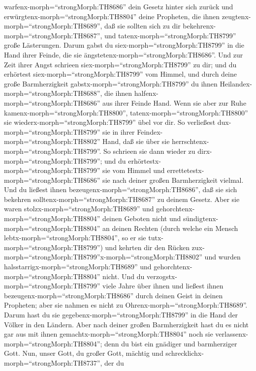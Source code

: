 warfenx-morph=``strongMorph:TH8686'' dein Gesetz hinter sich zurück und
erwürgtenx-morph=``strongMorph:TH8804'' deine Propheten, die ihnen
zeugtenx-morph=``strongMorph:TH8689'', daß sie sollten sich zu dir
bekehrenx-morph=``strongMorph:TH8687'', und
tatenx-morph=``strongMorph:TH8799'' große Lästerungen. 
Darum gabst du siex-morph=``strongMorph:TH8799'' in die Hand ihrer
Feinde, die sie ängstetenx-morph=``strongMorph:TH8686''. Und zur Zeit
ihrer Angst schrieen siex-morph=``strongMorph:TH8799'' zu dir; und du
erhörtest siex-morph=``strongMorph:TH8799'' vom Himmel, und durch deine
große Barmherzigkeit gabstx-morph=``strongMorph:TH8799'' du ihnen
Heilandex-morph=``strongMorph:TH8688'', die ihnen
halfenx-morph=``strongMorph:TH8686'' aus ihrer Feinde Hand.
 Wenn sie aber zur Ruhe
kamenx-morph=``strongMorph:TH8800'', tatenx-morph=``strongMorph:TH8800''
sie wiederx-morph=``strongMorph:TH8799'' übel vor dir. So verließest
dux-morph=``strongMorph:TH8799'' sie in ihrer
Feindex-morph=``strongMorph:TH8802'' Hand, daß sie über sie
herrschtenx-morph=``strongMorph:TH8799''. So schrieen sie dann wieder zu
dirx-morph=``strongMorph:TH8799''; und du
erhörtestx-morph=``strongMorph:TH8799'' sie vom Himmel und
errettetestx-morph=``strongMorph:TH8686'' sie nach deiner großen
Barmherzigkeit vielmal.  Und du ließest ihnen
bezeugenx-morph=``strongMorph:TH8686'', daß sie sich bekehren
solltenx-morph=``strongMorph:TH8687'' zu deinem Gesetz. Aber sie waren
stolzx-morph=``strongMorph:TH8689'' und
gehorchtenx-morph=``strongMorph:TH8804'' deinen Geboten nicht und
sündigtenx-morph=``strongMorph:TH8804'' an deinen Rechten (durch welche
ein Mensch lebtx-morph=``strongMorph:TH8804'', so er sie
tutx-morph=``strongMorph:TH8799'') und kehrten dir den Rücken
zux-morph=``strongMorph:TH8799''x-morph=``strongMorph:TH8802'' und
wurden halsstarrigx-morph=``strongMorph:TH8689'' und
gehorchtenx-morph=``strongMorph:TH8804'' nicht.  Und du
verzogstx-morph=``strongMorph:TH8799'' viele Jahre über ihnen und
ließest ihnen bezeugenx-morph=``strongMorph:TH8686'' durch deinen Geist
in deinen Propheten; aber sie nahmen es nicht zu
Ohrenx-morph=``strongMorph:TH8689''. Darum hast du sie
gegebenx-morph=``strongMorph:TH8799'' in die Hand der Völker in den
Ländern.  Aber nach deiner großen Barmherzigkeit hast du es
nicht gar aus mit ihnen gemachtx-morph=``strongMorph:TH8804'' noch sie
verlassenx-morph=``strongMorph:TH8804''; denn du bist ein gnädiger und
barmherziger Gott.  Nun, unser Gott, du großer Gott,
mächtig und schrecklichx-morph=``strongMorph:TH8737'', der du
